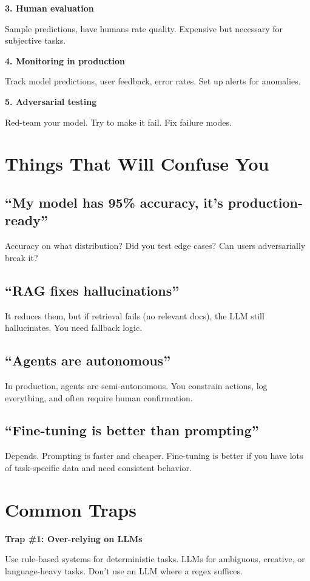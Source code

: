 \documentclass[11pt,oneside]{book}
\begin{document}
\textbf{3. Human evaluation}

Sample predictions, have humans rate quality. Expensive but necessary for subjective tasks.

\textbf{4. Monitoring in production}

Track model predictions, user feedback, error rates. Set up alerts for anomalies.

\textbf{5. Adversarial testing}

Red-team your model. Try to make it fail. Fix failure modes.

\section{Things That Will Confuse You}

\subsection{``My model has 95\% accuracy, it's production-ready''}
Accuracy on what distribution? Did you test edge cases? Can users adversarially break it?

\subsection{``RAG fixes hallucinations''}
It reduces them, but if retrieval fails (no relevant docs), the LLM still hallucinates. You need fallback logic.

\subsection{``Agents are autonomous''}
In production, agents are semi-autonomous. You constrain actions, log everything, and often require human confirmation.

\subsection{``Fine-tuning is better than prompting''}
Depends. Prompting is faster and cheaper. Fine-tuning is better if you have lots of task-specific data and need consistent behavior.

\section{Common Traps}

\textbf{Trap \#1: Over-relying on LLMs}

Use rule-based systems for deterministic tasks. LLMs for ambiguous, creative, or language-heavy tasks. Don't use an LLM where a regex suffices.
\end{document}
